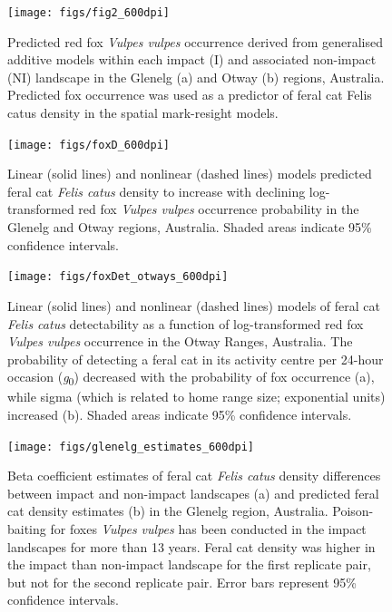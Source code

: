 \documentclass[]{elsarticle} %
\begin{document}
\newpage

\begin{figure}
\texttt{[image: figs/fig2\_600dpi]} \caption{Predicted red fox \textit{Vulpes vulpes} occurrence derived from generalised additive models within each impact (I) and associated non-impact (NI) landscape in the Glenelg (a) and Otway (b) regions, Australia. Predicted fox occurrence was used as a predictor of feral cat Felis catus density in the spatial mark-resight models.}\label{fig:foxplot}
\end{figure}

\newpage

\begin{figure}
\texttt{[image: figs/foxD\_600dpi]} \caption{Linear (solid lines) and nonlinear (dashed lines) models predicted feral cat \textit{Felis catus} density to increase with declining log-transformed red fox \textit{Vulpes vulpes} occurrence probability in the Glenelg and Otway regions, Australia. Shaded areas indicate 95\% confidence intervals.}\label{fig:dcor}
\end{figure}

\newpage

\begin{figure}
\texttt{[image: figs/foxDet\_otways\_600dpi]} \caption{Linear (solid lines) and nonlinear (dashed lines) models of feral cat \textit{Felis catus} detectability as a function of log-transformed red fox \textit{Vulpes vulpes} occurrence in the Otway Ranges, Australia. The probability of detecting a feral cat in its activity centre per 24-hour occasion (\textit{g}\textsubscript{0}) decreased with the probability of fox occurrence (a), while sigma (which is related to home range size; exponential units) increased (b). Shaded areas indicate 95\% confidence intervals.}\label{fig:detcor}
\end{figure}

\newpage

\begin{figure}
\texttt{[image: figs/glenelg\_estimates\_600dpi]} \caption{Beta coefficient estimates of feral cat \textit{Felis catus} density differences between impact and non-impact landscapes (a) and predicted feral cat density estimates (b) in the Glenelg region, Australia. Poison-baiting for foxes \textit{Vulpes vulpes} has been conducted in the impact landscapes for more than 13 years. Feral cat density was higher in the impact than non-impact landscape for the first replicate pair, but not for the second replicate pair. Error bars represent 95\% confidence intervals.}\label{fig:diffg}
\end{figure}
\end{document}
